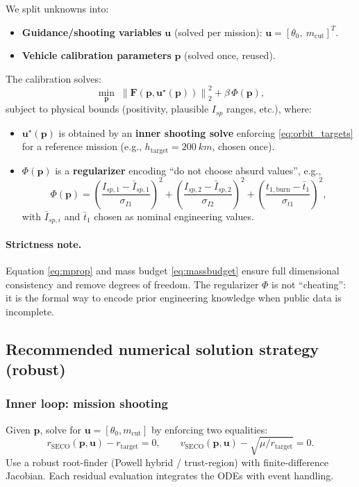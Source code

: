 \documentclass[11pt]{article}
\begin{document}
We split unknowns into:
\begin{itemize}
\item \textbf{Guidance/shooting variables} $\bm{u}$ (solved per mission): 
$\bm{u}=[\theta_0,\ m_{\text{cut}}]^T$.
\item \textbf{Vehicle calibration parameters} $\bm{p}$ (solved once, reused).
\end{itemize}

The calibration solves:
\begin{equation}\label{eq:calib_problem}
\min_{\bm{p}}\; 
\left\|\bm{F}(\bm{p},\bm{u}^\star(\bm{p}))\right\|_2^2
+\beta\,\Phi(\bm{p}),
\end{equation}
subject to physical bounds (positivity, plausible $I_{sp}$ ranges, etc.), where:
\begin{itemize}
\item $\bm{u}^\star(\bm{p})$ is obtained by an \textbf{inner shooting solve} enforcing \eqref{eq:orbit_targets} for a reference mission (e.g., $h_{\text{target}}=\SI{200}{km}$, chosen once).
\item $\Phi(\bm{p})$ is a \textbf{regularizer} encoding ``do not choose absurd values'', e.g.,
\[
\Phi(\bm{p})=
\left(\frac{I_{sp,1}-\bar I_{sp,1}}{\sigma_{I1}}\right)^2+
\left(\frac{I_{sp,2}-\bar I_{sp,2}}{\sigma_{I2}}\right)^2+
\left(\frac{t_{1,\text{burn}}-\bar t_1}{\sigma_{t1}}\right)^2,
\]
with $\bar I_{sp,i}$ and $\bar t_1$ chosen as nominal engineering values.
\end{itemize}

\paragraph{Strictness note.}
Equation \eqref{eq:mprop} and mass budget \eqref{eq:massbudget} ensure full dimensional consistency and remove degrees of freedom. The regularizer $\Phi$ is not ``cheating'': it is the formal way to encode prior engineering knowledge when public data is incomplete.

\subsection{Recommended numerical solution strategy (robust)}
\subsubsection{Inner loop: mission shooting}
Given $\bm{p}$, solve for $\bm{u}=[\theta_0,m_{\text{cut}}]$ by enforcing two equalities:
\[
r_{\text{SECO}}(\bm{p},\bm{u})-r_{\text{target}}=0,\qquad
v_{\text{SECO}}(\bm{p},\bm{u})-\sqrt{\mu/r_{\text{target}}}=0.
\]
Use a robust root-finder (Powell hybrid / trust-region) with finite-difference Jacobian. Each residual evaluation integrates the ODEs with event handling.
\end{document}
